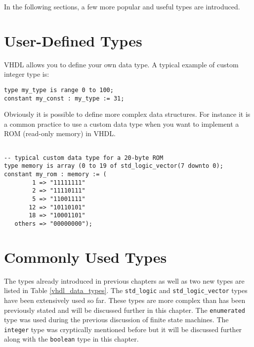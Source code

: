 In the following sections, a few more popular and useful types are introduced.

\section{User-Defined Types}
VHDL allows you to define your own data type. A typical example of custom integer type is:

\noindent
\texttt{type my\_type is range 0 to 100;}\\
\texttt{constant my\_const : my\_type := 31;}

\noindent
Obviously it is possible to define more complex data structures. For instance it is a common practice to use a custom data type when you want to implement a ROM (read-only memory) in VHDL.

\noindent
\begin{minipage}{0.99\linewidth}
\begin{lstlisting}

-- typical custom data type for a 20-byte ROM
type memory is array (0 to 19 of std_logic_vector(7 downto 0);
constant my_rom : memory := (
        1 => "11111111"
        2 => "11110111"
        5 => "11001111"
       12 => "10110101"
       18 => "10001101"
   others => "00000000");
\end{lstlisting}
\end{minipage}

\section{Commonly Used Types}
The types already introduced in previous chapters as well as two new types are listed in Table \ref{vhdl_data_types}. The \texttt{std\_logic} and \texttt{std\_logic\_vector} types have been extensively used so far. These types are more complex than has been previously stated and will be discussed further in this chapter. The \texttt{enumerated} type was used during the previous discussion of finite state machines. The \texttt{integer} type was cryptically mentioned before but it will be discussed further along with the \texttt{boolean} type in this chapter. 

